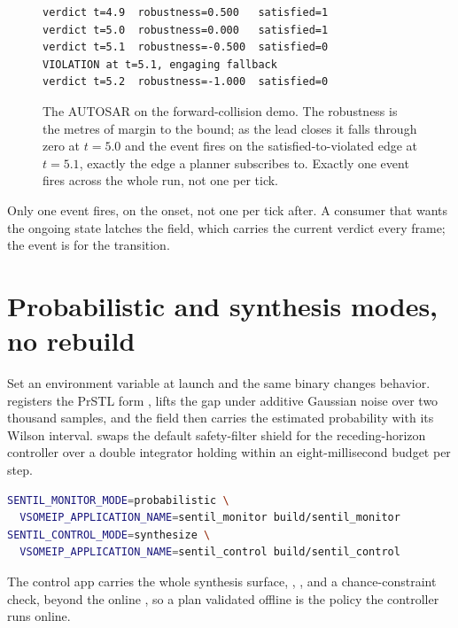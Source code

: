 \begin{figure}[h]
\centering
\begin{lstlisting}
verdict t=4.9  robustness=0.500   satisfied=1
verdict t=5.0  robustness=0.000   satisfied=1
verdict t=5.1  robustness=-0.500  satisfied=0
VIOLATION at t=5.1, engaging fallback
verdict t=5.2  robustness=-1.000  satisfied=0
\end{lstlisting}
\caption{The AUTOSAR  on the forward-collision demo. The robustness is the metres of margin to the bound; as the lead closes it falls through zero at $t=5.0$ and the  event fires on the satisfied-to-violated edge at $t=5.1$, exactly the edge a planner subscribes to. Exactly one event fires across the whole run, not one per tick.}
\end{figure}

\begin{pitfall}
Only one  event fires, on the onset, not one per tick after. A consumer that wants the ongoing state latches the  field, which carries the current verdict every frame; the event is for the transition.
\end{pitfall}

\section{Probabilistic and synthesis modes, no rebuild}

Set an environment variable at launch and the same binary changes behavior.  registers the PrSTL form , lifts the gap under additive Gaussian noise over two thousand samples, and the  field then carries the estimated probability with its Wilson interval.  swaps the default safety-filter shield for the receding-horizon controller over a double integrator holding  within an eight-millisecond budget per step.

\begin{lstlisting}[language=bash]
SENTIL_MONITOR_MODE=probabilistic \
  VSOMEIP_APPLICATION_NAME=sentil_monitor build/sentil_monitor
SENTIL_CONTROL_MODE=synthesize \
  VSOMEIP_APPLICATION_NAME=sentil_control build/sentil_control
\end{lstlisting}

The control app carries the whole synthesis surface, , , and a chance-constraint check, beyond the online , so a plan validated offline is the policy the controller runs online.

